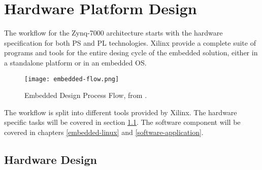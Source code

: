 %  
%  
%  
%  
%  
%  

\chapter{Hardware Platform Design}

The workflow for the Zynq-7000 architecture starts with the hardware specification for both PS and
PL technologies. Xilinx provide a complete suite of programs and tools for the entire desing cycle
of the embedded solution, either in a standalone platform or in an embedded OS.

\begin{figure}[htp]
	\centering
	\texttt{[image: embedded-flow.png]}
	\caption{Embedded Design Process Flow, from \cite{UG1043}.} \label{fig:embedded-flow}
\end{figure}%

The workflow is split into different tools provided by Xilinx. The hardware specific tasks will be
covered in section \ref{hardware-design}. The software component will be covered in chapters
\ref{embedded-linux} and \ref{software-application}.

\section{Hardware Design} \label{hardware-design}


